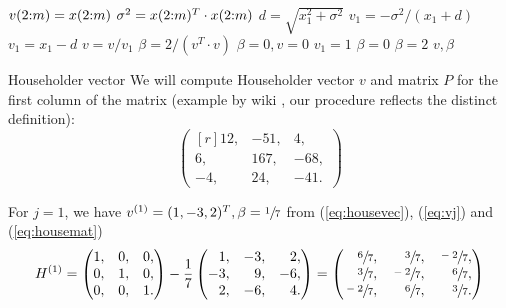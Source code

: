 \begin{refsection}
\begin{algorithm}
  \caption{Householder vector}
  \label{alg:housevec}
  \begin{algorithmic}

    \State {}
    \State $v(2{:}m) = x(2{:}m)$
    \State $\sigma^2 = x(2{:}m)^T \cdot x(2{:}m)$
    \State $d = \sqrt{x_1^2 + \sigma^2}$
    \State $v_1 = -\sigma^2 / (x_1 + d)$
    \Else
    \State $v_1 = x_1 - d$
    \EndIf
    \State $v = v / v_1$
    \State $\beta = 2 / (v^T \cdot v)$
    \Else
    \State $\beta = 0, v = 0$
    \EndIf
    \Else
    \State $v_1 = 1$
    \State $\beta = 0$
    \Else
    \State $\beta = 2$
    \EndIf
    \EndIf
    \State \Return $v, \beta$
    \EndFunction
  \end{algorithmic}
\end{algorithm}


\begin{example}{Householder vector}
  \label{ex:housevec}
  We will compute Householder vector $v$ and matrix $P$
  for the first column of the matrix
  (example by wiki ,
  our procedure reflects the distinct definition):
  \begin{equation}
    \begin{pmatrix*}[r]
      12, & -51, & 4,\\
      6, & 167, & -68,\\
      -4, & 24, & -41.
    \end{pmatrix*}
  \end{equation}

  For $j = 1$, we have
  $v^{(1)} = (1, -3, 2)^T, \beta = \sfrac{1}{7}$
  from (\ref{eq:housevec}), (\ref{eq:vj}) and (\ref{eq:housemat})
  \begin{equation}
    H^{(1)} =
    \begin{pmatrix*}[r]
      1, & 0, & 0,\\
      0, & 1, & 0,\\
      0, & 0, & 1.
    \end{pmatrix*}
    - \frac{1}{7}
    \begin{pmatrix*}[r]
      1, & -3, &  2,\\
     -3, &  9, & -6,\\
      2, & -6, &  4.
    \end{pmatrix*} =
    \begin{pmatrix*}[r]
      \sfrac{6}{7},  & \sfrac{3}{7},  &  \sfrac{-2}{7},\\
      \sfrac{3}{7},  & \sfrac{-2}{7}, &  \sfrac{6}{7},\\
      \sfrac{-2}{7}, & \sfrac{6}{7},  &  \sfrac{3}{7}.
    \end{pmatrix*}
  \end{equation}


\end{example}
\end{refsection}
